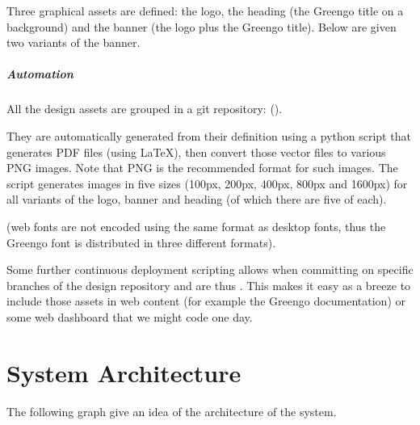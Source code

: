 \documentclass[letterpaper,10pt,english]{sphinxmanual}
\begin{document}
Three graphical assets are defined: the logo, the heading (the Greengo title on a background) and the banner (the logo plus the Greengo title).
Below are given two variants of the banner.

\begin{figure}[htbp]
\centering

\noindent{}
\end{figure}

\begin{figure}[htbp]
\centering

\noindent{}
\end{figure}


\paragraph{Automation}
\label{\detokenize{blog/2020/01/branding:automation}}
All the design assets are grouped in a git repository:  ().

They are automatically generated from their definition using a python script that generates PDF files (using LaTeX), then convert those vector files to various PNG images.
Note that PNG is the recommended format for such images.
The script generates images in five sizes (100px, 200px, 400px, 800px and 1600px) for all variants of the logo, banner and heading (of which there are five of each).

 (web fonts are not encoded using the same format as desktop fonts, thus the Greengo font is distributed in three different formats).

Some further continuous deployment scripting allows  when committing on specific branches of the design repository and are thus .
This makes it easy as a breeze to include those assets in web content (for example the Greengo documentation) or some web dashboard that we might code one day.


\chapter{System Architecture}
\label{\detokenize{system_architecture:system-architecture}}\label{\detokenize{system_architecture::doc}}
The following graph give an idea of the architecture of the system.
\end{document}
